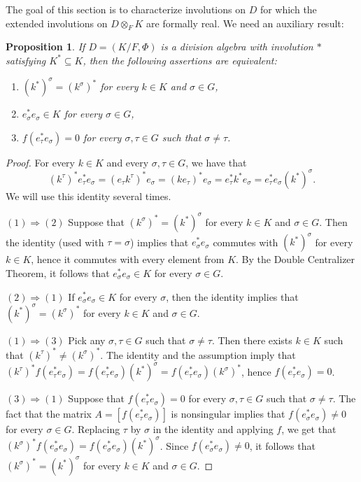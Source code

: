 \documentclass[12pt,reqno]{amsart}
\newtheorem{prop}[thm]{Proposition}
\theoremstyle{definition}
\begin{document}
The goal of this section is to characterize involutions on $D$
for which the extended involutions on $D \otimes_F K$ are formally real. 
We need an auxiliary result:

\begin{prop}
\label{exti}
If $D=(K/F,\Phi)$ is a division algebra with involution $\ast$
satisfying $K^\ast \subseteq K$, then the following assertions are equivalent:
\begin{enumerate}
\item $(k^\ast)^\sigma=(k^\sigma)^\ast$ for every $k \in K$ and $\sigma \in G$,
\item $e_\sigma^\ast e_\sigma \in K$ for every $\sigma \in G$,
\item $f(e_\tau^\ast e_\sigma)=0$ for every $\sigma, \tau \in G$ such that $\sigma \ne \tau$.
\end{enumerate}
\end{prop}

\begin{proof} For every $k \in K$ and every $\sigma, \tau \in G$, we have that
\[
(k^\tau)^\ast e_\tau^\ast e_\sigma = 
(e_\tau k^\tau)^\ast e_\sigma =
(k e_\tau)^\ast e_\sigma = 
e_\tau^\ast k^\ast e_\sigma=
e_\tau^\ast e_\sigma (k^\ast)^\sigma.
\]
We will use this identity several times.

$(1) \Rightarrow (2)$ Suppose that $(k^\sigma)^\ast= (k^\ast)^\sigma$
for every $k \in K$ and $\sigma \in G$. Then the identity (used with $\tau=\sigma$) implies 
that $e_\sigma^\ast e_\sigma$ commutes with $(k^\ast)^\sigma$ for every $k \in K$, 
hence it commutes with every element from $K$. By the Double Centralizer Theorem, 
it follows that $e_\sigma^\ast e_\sigma \in K$ for every $\sigma \in G$.

$(2) \Rightarrow (1)$ If $e_\sigma^\ast e_\sigma \in K$ for every $\sigma$, 
then the identity implies that $(k^\ast)^\sigma=(k^\sigma)^\ast$ 
for every $k \in K$ and $\sigma \in G$.

$(1) \Rightarrow (3)$ Pick any $\sigma, \tau \in G$ such that $\sigma \ne \tau$.
Then there exists $k \in K$ such that $(k^\tau)^\ast \ne (k^\sigma)^\ast$.
The identity and the assumption imply that
$(k^\tau)^\ast f(e_\tau^\ast e_\sigma) = 
f(e_\tau^\ast e_\sigma) (k^\ast)^\sigma =
f(e_\tau^\ast e_\sigma) (k^\sigma)^\ast$,
hence $f(e_\tau^\ast e_\sigma) = 0$. 

$(3) \Rightarrow (1)$ Suppose that $f(e_\tau^\ast e_\sigma)=0$ 
for every $\sigma, \tau \in G$ such that $\sigma \ne \tau$. The fact that
the matrix $A = [f(e_\tau^\ast e_\sigma)]$ is nonsingular implies that
$f(e_\sigma^\ast e_\sigma) \ne 0$ for every $\sigma \in G$. 
Replacing $\tau$ by $\sigma$ in the identity and applying $f$, we get that 
$(k^\sigma)^\ast f(e_\sigma^\ast e_\sigma)
= f(e_\sigma^\ast e_\sigma) (k^\ast)^\sigma$. 
Since $f(e_\sigma^\ast e_\sigma) \ne 0$, it follows that 
$(k^\sigma)^\ast= (k^\ast)^\sigma$
for every $k \in K$ and $\sigma \in G$. 
\end{proof}
\end{document}
